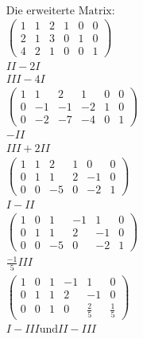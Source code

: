\begin{align*}
    \text{Die erweiterte Matrix:}                \\
    \begin{pmatrix}
        1 & 1 & 2 & 1 & 0 & 0 \\
        2 & 1 & 3 & 0 & 1 & 0 \\
        4 & 2 & 1 & 0 & 0 & 1
    \end{pmatrix}                        \\
    II - 2I                                      \\
    III - 4I                                     \\
    \begin{pmatrix}
        1 & 1  & 2  & 1  & 0 & 0 \\
        0 & -1 & -1 & -2 & 1 & 0 \\
        0 & -2 & -7 & -4 & 0 & 1
    \end{pmatrix}                     \\
    -II                                          \\
    III + 2II                                    \\
    \begin{pmatrix}
        1 & 1 & 2  & 1 & 0  & 0 \\
        0 & 1 & 1  & 2 & -1 & 0 \\
        0 & 0 & -5 & 0 & -2 & 1
    \end{pmatrix}                      \\
    I - II                                       \\
    \begin{pmatrix}
        1 & 0 & 1  & -1 & 1  & 0 \\
        0 & 1 & 1  & 2  & -1 & 0 \\
        0 & 0 & -5 & 0  & -2 & 1
    \end{pmatrix}                     \\
    \frac{-1}{5}III                              \\
    \begin{pmatrix}
        1 & 0 & 1 & -1 & 1           & 0           \\
        0 & 1 & 1 & 2  & -1          & 0           \\
        0 & 0 & 1 & 0  & \frac{2}{5} & \frac{1}{5}
    \end{pmatrix}   \\
    I - III \text{und} II - III                  \\

\end{align*}

